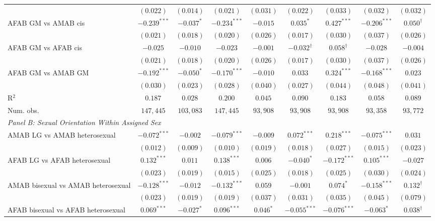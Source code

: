 \begin{table}[htpb!]
{\begin{tabular}{l c c c c c c c c}
 & $(0.022)$ & $(0.014)$ & $(0.021)$ & $(0.031)$ & $(0.022)$ & $(0.033)$ & $(0.032)$ & $(0.032)$ \\
AFAB GM vs AMAB cis & $-0.239^{***}$ & $-0.037^{*}$ & $-0.234^{***}$ & $-0.015$ & $0.035^{*}$ & $0.427^{***}$ & $-0.206^{***}$ & $0.050^{\dagger}$ \\
 & $(0.021)$ & $(0.018)$ & $(0.020)$ & $(0.026)$ & $(0.017)$ & $(0.030)$ & $(0.037)$ & $(0.026)$ \\
AFAB GM vs AFAB cis & $-0.025$ & $-0.010$ & $-0.023$ & $-0.001$ & $-0.032^{\dagger}$ & $0.058^{\dagger}$ & $-0.028$ & $-0.004$ \\
 & $(0.021)$ & $(0.018)$ & $(0.020)$ & $(0.026)$ & $(0.017)$ & $(0.030)$ & $(0.037)$ & $(0.026)$ \\
AFAB GM vs AMAB GM & $-0.192^{***}$ & $-0.050^{*}$ & $-0.170^{***}$ & $-0.010$ & $0.033$ & $0.324^{***}$ & $-0.168^{***}$ & $0.023$ \\
 & $(0.030)$ & $(0.023)$ & $(0.028)$ & $(0.040)$ & $(0.027)$ & $(0.044)$ & $(0.048)$ & $(0.041)$ \\
\hline
R$^2$ & $0.187$ & $0.028$ & $0.200$ & $0.045$ & $0.090$ & $0.183$ & $0.058$ & $0.089$ \\
Num. obs. & $147,445$ & $103,083$ & $147,445$ & $93,908$ & $93,908$ & $93,908$ & $93,358$ & $93,772$ \\
\hline
\multicolumn{9}{l}{\textit{Panel B: Sexual Orientation Within Assigned Sex}} \\
AMAB LG vs AMAB heterosexual & $-0.072^{***}$ & $-0.002$ & $-0.079^{***}$ & $-0.009$ & $0.072^{***}$ & $0.218^{***}$ & $-0.075^{***}$ & $0.031$ \\
 & $(0.012)$ & $(0.009)$ & $(0.010)$ & $(0.019)$ & $(0.018)$ & $(0.027)$ & $(0.015)$ & $(0.023)$ \\
AFAB LG vs AFAB heterosexual & $0.132^{***}$ & $0.011$ & $0.138^{***}$ & $0.006$ & $-0.040^{*}$ & $-0.172^{***}$ & $0.105^{***}$ & $-0.027$ \\
 & $(0.023)$ & $(0.019)$ & $(0.015)$ & $(0.025)$ & $(0.018)$ & $(0.025)$ & $(0.030)$ & $(0.024)$ \\
AMAB bisexual vs AMAB heterosexual & $-0.128^{***}$ & $-0.012$ & $-0.132^{***}$ & $0.059$ & $-0.001$ & $0.074^{*}$ & $-0.158^{***}$ & $0.132^{\dagger}$ \\
 & $(0.023)$ & $(0.019)$ & $(0.019)$ & $(0.037)$ & $(0.031)$ & $(0.035)$ & $(0.045)$ & $(0.079)$ \\
AFAB bisexual vs AFAB heterosexual & $0.069^{***}$ & $-0.027^{*}$ & $0.096^{***}$ & $0.046^{*}$ & $-0.055^{***}$ & $-0.076^{***}$ & $-0.063^{*}$ & $0.038^{\dagger}$ \\

\end{tabular}}
\end{table}
